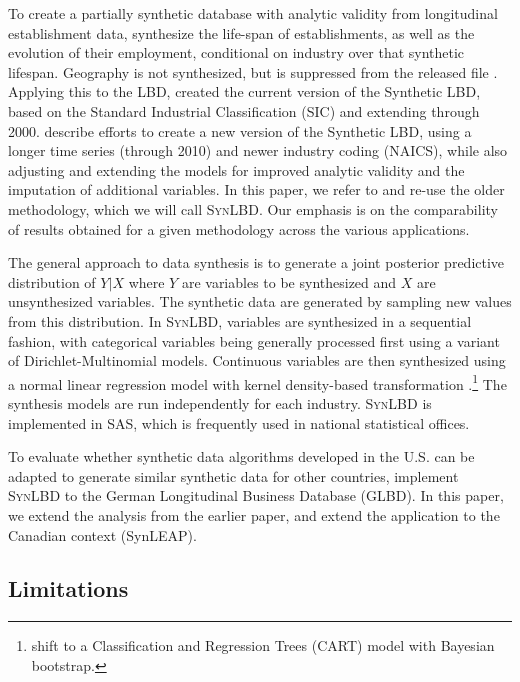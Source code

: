 \documentclass[10pt,twoside]{article}
\newcommand{\SynLBD}{\textsc{SynLBD}}
\begin{document}
To create a partially synthetic database with analytic validity from longitudinal establishment data, \citet{RePEc:cen:tnotes:11-01} synthesize the life-span of establishments, as well as the evolution of their employment, conditional on industry over that synthetic lifespan. Geography is not synthesized, but is suppressed from the released file \citep{RePEc:cen:tnotes:11-01}. Applying this to the \ac{LBD}, \citet{KinneyEtAl2011}  created the current version of the Synthetic LBD,  based on the Standard Industrial Classification (SIC) and extending through 2000. \citet{RePEc:cen:wpaper:14-12} describe efforts to create a new version of the Synthetic LBD, using a longer time  series (through 2010) and newer industry coding (NAICS), while also adjusting and extending the models for  improved  analytic validity and  the imputation of additional variables. In this paper, we refer to and re-use the older methodology, which we will call \SynLBD. Our emphasis is on the comparability of results obtained for a given methodology across the various applications.
  

The general approach to data synthesis is to generate a joint posterior predictive distribution of $Y|X$ where $Y$ are variables to be synthesized and $X$ are unsynthesized variables. The synthetic data are generated by sampling new values from this distribution. In \SynLBD, variables are synthesized in a sequential fashion, with categorical variables being generally processed first using a variant of Dirichlet-Multinomial models. Continuous variables are then synthesized using a normal linear regression model with kernel density-based transformation \citep{WOODCOCK20094228}.\footnote{\textcite{RePEc:cen:wpaper:14-12} shift  to a Classification and Regression Trees (CART) model with Bayesian bootstrap. } The synthesis models are run independently for each industry. \SynLBD{} is implemented in SAS\texttrademark, which is frequently used in national statistical offices.

To evaluate whether synthetic data algorithms developed in the U.S. can be adapted to generate similar synthetic data for other countries, \textcite{RePEc:cen:wpaper:14-13} implement \SynLBD{} to the German Longitudinal Business Database (GLBD). In this paper, we extend the analysis from the earlier paper, and extend the application to the Canadian context (SynLEAP). 

\subsection{Limitations}
\end{document}
